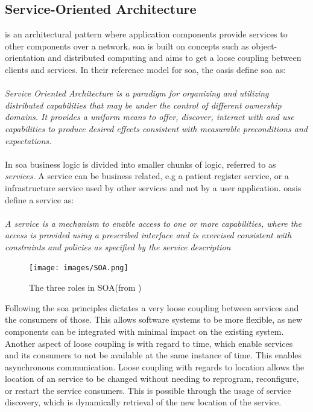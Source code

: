 \documentclass[USenglish]{ifimaster}
\begin{document}
\subsection{Service-Oriented Architecture}
 is an architectural pattern where application components
provide services to other components over a network. \gls{soa} is built on
concepts such as object-orientation and distributed computing and aims to get
a loose coupling between clients and services. In their reference model for
\gls{soa}\cite{oasis-soa-reference-model}, the \gls{oasis} define \gls{soa} as: \paragraph{}
\textit{Service Oriented Architecture is a paradigm for organizing and utilizing
distributed capabilities that may be under the control of different ownership
domains. It provides a uniform means to offer, discover, interact with and use
capabilities to produce desired effects consistent with measurable preconditions
and expectations.} %

\paragraph{}
 In \gls{soa} business logic is divided into smaller chunks of logic, referred
 to as \textit{services}. A service can be business related, e.g a patient
 register service, or a infrastructure service used by other services and not by
 a user application. \gls{oasis} define a service as:
 \paragraph{}
\textit{
A service is a mechanism to enable access to one or more capabilities, where the
access is  provided using a prescribed interface and is exercised consistent
with constraints and policies as  specified by the service description
}

\begin{figure}[h]
\texttt{[image: images/SOA.png]}
\caption{The three roles in SOA(from \cite{IST-090})}
\end{figure}

Following the \gls{soa} principles dictates a very loose coupling between
services and the consumers of those. This allows software systems to be more
flexible, as new components can be integrated with minimal impact on the
existing system. Another aspect of loose coupling is with regard to time, which
enable services and its consumers to not be available at the same instance of
time. This enables asynchronous communication. Loose coupling with regards to
location allows the location of an service to be changed without needing to
reprogram, reconfigure, or restart the service consumers. This is possible
through the usage of service discovery, which is dynamically retrieval of the
new location of the service.
\end{document}
